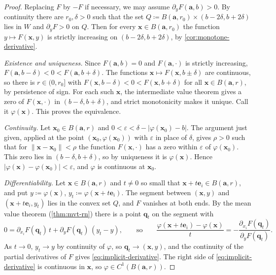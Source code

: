 \begin{proof}
Replacing $F$ by $-F$ if necessary, we may assume $\partial_yF(\mathbf a,b)>0$. By continuity there are $r_0,\delta>0$ such that the set $Q\coloneqq B(\mathbf a,r_0)\times(b-2\delta,b+2\delta)$ lies in $W$ and $\partial_yF>0$ on $Q$. Then for every $\mathbf x\in B(\mathbf a,r_0)$ the function $y\mapsto F(\mathbf x,y)$ is strictly increasing on $(b-2\delta,b+2\delta)$, by \cref{cor:monotone-derivative}.

\emph{Existence and uniqueness.} Since $F(\mathbf a,b)=0$ and $F(\mathbf a,\cdot)$ is strictly increasing, $F(\mathbf a,b-\delta)<0<F(\mathbf a,b+\delta)$. The functions $\mathbf x\mapsto F(\mathbf x,b\pm\delta)$ are continuous, so there is $r\in(0,r_0]$ with $F(\mathbf x,b-\delta)<0<F(\mathbf x,b+\delta)$ for all $\mathbf x\in B(\mathbf a,r)$, by persistence of sign. For each such $\mathbf x$, the intermediate value theorem gives a zero of $F(\mathbf x,\cdot)$ in $(b-\delta,b+\delta)$, and strict monotonicity makes it unique. Call it $\varphi(\mathbf x)$. This proves the equivalence.

\emph{Continuity.} Let $\mathbf x_0\in B(\mathbf a,r)$ and $0<\varepsilon<\delta-|\varphi(\mathbf x_0)-b|$. The argument just given, applied at the point $(\mathbf x_0,\varphi(\mathbf x_0))$ with $\varepsilon$ in place of $\delta$, gives $\rho>0$ such that for $\|\mathbf x-\mathbf x_0\|<\rho$ the function $F(\mathbf x,\cdot)$ has a zero within $\varepsilon$ of $\varphi(\mathbf x_0)$. This zero lies in $(b-\delta,b+\delta)$, so by uniqueness it is $\varphi(\mathbf x)$. Hence $|\varphi(\mathbf x)-\varphi(\mathbf x_0)|<\varepsilon$, and $\varphi$ is continuous at $\mathbf x_0$.

\emph{Differentiability.} Let $\mathbf x\in B(\mathbf a,r)$ and $t\ne0$ so small that $\mathbf x+t\mathbf e_i\in B(\mathbf a,r)$, and put $y\coloneqq\varphi(\mathbf x)$, $y_t\coloneqq\varphi(\mathbf x+t\mathbf e_i)$. The segment between $(\mathbf x,y)$ and $(\mathbf x+t\mathbf e_i,y_t)$ lies in the convex set $Q$, and $F$ vanishes at both ends. By the mean value theorem (\cref{thm:mvt-rn}) there is a point $\mathbf q_t$ on the segment with
\[
0=\partial_{x_i}F(\mathbf q_t)\,t+\partial_yF(\mathbf q_t)\,(y_t-y),\qquad\text{so}\qquad\frac{\varphi(\mathbf x+t\mathbf e_i)-\varphi(\mathbf x)}t=-\frac{\partial_{x_i}F(\mathbf q_t)}{\partial_yF(\mathbf q_t)} .
\]
As $t\to0$, $y_t\to y$ by continuity of $\varphi$, so $\mathbf q_t\to(\mathbf x,y)$, and the continuity of the partial derivatives of $F$ gives \eqref{eq:implicit-derivative}. The right side of \eqref{eq:implicit-derivative} is continuous in $\mathbf x$, so $\varphi\in C^1(B(\mathbf a,r))$.
\end{proof}

